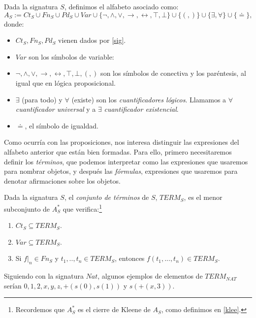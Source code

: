\begin{definition}
Dada la signatura $S$, definimos el alfabeto asociado como:
$$A_{S} := Ct_S \cup Fn_S \cup Pd_S \cup Var \cup \{\neg, \land, \lor, \rightarrow, \leftrightarrow, \top, \bot \} \cup \{(, )\} \cup \{\exists, \forall\} \cup \{ \doteq \},$$
donde:
\begin{itemize}
    \item $Ct_S,Fn_S,Pd_S$ vienen dados por \ref{sig}.
    \item $Var$ son los símbolos de variable: 
    \item $\neg, \land, \lor, \rightarrow, \leftrightarrow, \top, \bot,(,)$ son los símbolos de conectiva y los paréntesis, al igual que en lógica proposicional.
    \item $\exists$ (para todo) y $\forall$ (existe) son los \textit{cuantificadores lógicos}. Llamamos a $\forall$ \textit{cuantificador universal} y a $\exists$ \textit{cuantificador existencial}.
    \item $\doteq$, el símbolo de igualdad.
\end{itemize}

\end{definition}

Como ocurría con las proposiciones, nos interesa distinguir las expresiones del alfabeto anterior que están bien formadas. Para ello, primero necesitaremos definir los \textit{términos}, que podemos interpretar como las expresiones que usaremos para nombrar objetos, y después las \textit{fórmulas}, expresiones que usaremos para denotar afirmaciones sobre los objetos.

\begin{definition}\label{term}
Dada la signatura $S$, el \textit{conjunto de términos} de $S$, $TERM_S$, es el menor subconjunto de $A_{S}^*$ que verifica:\footnote{Recordemos que $A_{S}^*$ es el cierre de Kleene de $A_{S}$, como definimos en \ref{klee}.}
\begin{enumerate}
    \item $Ct_S\subseteq TERM_S$.
    \item $Var\subseteq TERM_S$.
    \item Si $f|_{n} \in Fn_S$ y $t_1, .., t_n \in TERM_S$, entonces $f(t_1, ..., t_n) \in TERM_S$. 
\end{enumerate}
\end{definition}

\begin{example}
Siguiendo con la signatura $Nat$, algunos ejemplos de elementos de $TERM_{NAT}$ serían  $0, 1, 2, x, y, z,+(s(0), s(1))$ y $s(+(x,3))$.
\end{example}

